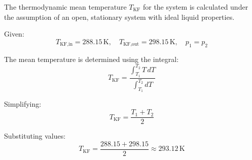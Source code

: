 The thermodynamic mean temperature \( T_{\text{KF}} \) for the system is calculated under the assumption of an open, stationary system with ideal liquid properties.  

Given:  
\[
T_{\text{KF,in}} = 288.15 \, \text{K}, \quad T_{\text{KF,out}} = 298.15 \, \text{K}, \quad p_1 = p_2
\]  

The mean temperature is determined using the integral:  
\[
T_{\text{KF}} = \frac{\int_{T_1}^{T_2} T \, dT}{\int_{T_1}^{T_2} dT}
\]  

Simplifying:  
\[
T_{\text{KF}} = \frac{T_1 + T_2}{2}
\]  

Substituting values:  
\[
T_{\text{KF}} = \frac{288.15 + 298.15}{2} \approx 293.12 \, \text{K}
\]